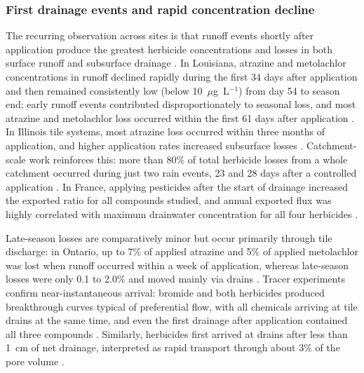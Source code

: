 \documentclass[11pt]{article}
\begin{document}
\subsubsection{First drainage events and rapid concentration decline}
The recurring observation across sites is that runoff events shortly after application produce the greatest herbicide concentrations and losses in both surface runoff and subsurface drainage \parencite{GAYNOR1995}. In Louisiana, atrazine and metolachlor concentrations in runoff declined rapidly during the first 34 days after application and then remained consistently low (below 10~$\mu$g~L$^{-1}$) from day 54 to season end; early runoff events contributed disproportionately to seasonal loss, and most atrazine and metolachlor loss occurred within the first 61 days after application \parencite{SOUTHWICK1990}. In Illinois tile systems, most atrazine loss occurred within three months of application, and higher application rates increased subsurface losses \parencite{Kalita2006}. Catchment-scale work reinforces this: more than 80\% of total herbicide losses from a whole catchment occurred during just two rain events, 23 and 28 days after a controlled application \parencite{Leu2004}. In France, applying pesticides after the start of drainage increased the exported ratio for all compounds studied, and annual exported flux was highly correlated with maximum drainwater concentration for all four herbicides \parencite{Julien2023}.

Late-season losses are comparatively minor but occur primarily through tile discharge: in Ontario, up to 7\% of applied atrazine and 5\% of applied metolachlor was lost when runoff occurred within a week of application, whereas late-season losses were only 0.1 to 2.0\% and moved mainly via drains \parencite{GAYNOR1995}. Tracer experiments confirm near-instantaneous arrival: bromide and both herbicides produced breakthrough curves typical of preferential flow, with all chemicals arriving at tile drains at the same time, and even the first drainage after application contained all three compounds \parencite{Fortin2002}. Similarly, herbicides first arrived at drains after less than 1~cm of net drainage, interpreted as rapid transport through about 3\% of the pore volume \parencite{Dousset2004}.
\end{document}
